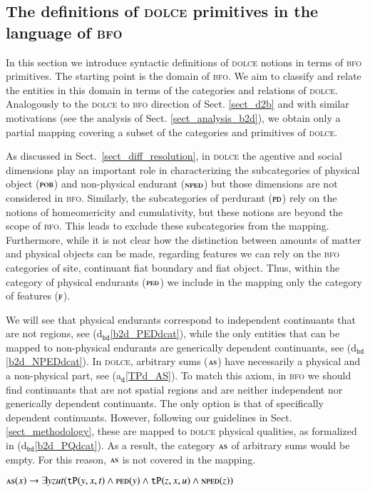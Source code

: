 \documentclass[ao]{iosart2x}
\newcommand{\bflist}{\begin{list}{}{\setlength{\topsep}{2mm}\setlength{\parsep}{0mm}\setlength{\leftmargin}{9.2mm}\setlength{\labelwidth}{8mm}}}
\newcommand{\eflist}{\end{list}}
\newcommand{\dolceAxLabel}{\textrm{a$_\texttt{d}$}}
\newcommand{\bdDefLabel}{\textrm{d$_\texttt{bd}$}}
\newcounter{cntax}
\newcommand{\dolceax}[1]{\refstepcounter{cntax}\begin{small}{\bf \dolceAxLabel\thecntax\label{#1}}\end{small}}
\newcommand{\refdolceax}[1]{({\dolceAxLabel}\ref{#1})}
\newcommand{\refbddf}[1]{({\bdDefLabel}\ref{#1})}
\newcommand{\pr}[1]{\mathtt{#1}}
\newcommand{\dolce}{{\textsc{dolce}}}
\newcommand{\bfo}{{\textsc{bfo}}}
\newcommand {\ASdcat} {\textsc{as}}
\newcommand {\Fdcat} {\textsc{f}}
\newcommand {\NPEDdcat} {\textsc{nped}}
\newcommand {\PDdcat} {\textsc{pd}}
\newcommand {\PEDdcat} {\textsc{ped}}
\newcommand {\POBdcat} {\textsc{pob}}
\newcommand {\TPd} {\ensuremath{\pr{tP}}}
\begin{document}
\subsection{The definitions of {\dolce} primitives in the language of {\bfo}}\label{sect_mappings_b2d}

In this section we introduce syntactic definitions of {\dolce} notions in terms of {\bfo} primitives. 
The starting point is the domain of {\bfo}. We aim to classify and relate the entities in this domain in terms of the categories and relations of {\dolce}.
Analogously to the {\dolce} to {\bfo} direction of Sect. \ref{sect_d2b} and with similar motivations (see the analysis of Sect. \ref{sect_analysis_b2d}), we obtain only a partial mapping covering a subset of the categories and primitives of {\dolce}.  

As discussed in Sect.~\ref{sect_diff_resolution}, in {\dolce} the agentive and social dimensions play an important role in characterizing the subcategories of physical object ($\POBdcat$) and non-physical endurant ($\NPEDdcat$) but those dimensions are not considered in {\bfo}. Similarly, the subcategories of perdurant ($\PDdcat$) rely on the notions of homeomericity and cumulativity, but these notions are beyond the scope of {\bfo}. This leads to exclude these subcategories from the mapping. Furthermore, while it is not clear how the distinction between amounts of matter and physical objects can be made, regarding features we can rely on the {\bfo} categories of site, continuant fiat boundary and fiat object. Thus, within the category of physical endurants ($\PEDdcat$) we include in the mapping only the category of features ($\Fdcat$). 

We will see that physical endurants correspond to independent continuants that are not regions,
see \refbddf{b2d_PEDdcat}, while the only entities that can be mapped to non-physical endurants are generically dependent continuants, see \refbddf{b2d_NPEDdcat}. In {\dolce}, arbitrary sums ($\ASdcat$) have necessarily a physical and a non-physical part, see \refdolceax{TPd_AS}. To match this axiom, in {\bfo} we should find continuants that are not spatial regions and are neither independent nor generically dependent continuants. The only option is that of specifically dependent continuants. However, following our guidelines in Sect. \ref{sect_methodology}, these are mapped to {\dolce} physical qualities, as formalized in \refbddf{b2d_PQdcat}. As a result, the category $\ASdcat$ of arbitrary sums would be empty. For this reason, $\ASdcat$ is not covered in the mapping.   
%
\bflist
\item[\dolceax{TPd_AS}] $\ASdcat(x) \to \exists yzut(\TPd(y,x,t) \land \PEDdcat(y) \land \TPd(z,x,u) \land \NPEDdcat(z))$  
\eflist
\end{document}
